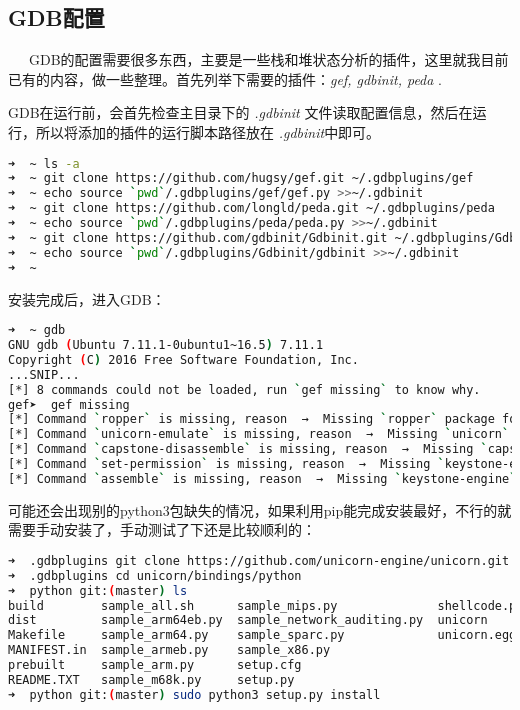 \documentclass[12pt]{article}  %
\begin{document}
\subsection{GDB配置}
\ \ \ GDB的配置需要很多东西，主要是一些栈和堆状态分析的插件，这里就我目前已有的内容，做一些整理。首先列举下需要的插件：\emph{gef, gdbinit, peda} .\par
GDB在运行前，会首先检查主目录下的 \emph{.gdbinit} 文件读取配置信息，然后在运行，所以将添加的插件的运行脚本路径放在 \emph{.gdbinit}中即可。
\begin{lstlisting}[language=sh]
➜  ~ ls -a
➜  ~ git clone https://github.com/hugsy/gef.git ~/.gdbplugins/gef
➜  ~ echo source `pwd`/.gdbplugins/gef/gef.py >>~/.gdbinit
➜  ~ git clone https://github.com/longld/peda.git ~/.gdbplugins/peda
➜  ~ echo source `pwd`/.gdbplugins/peda/peda.py >>~/.gdbinit
➜  ~ git clone https://github.com/gdbinit/Gdbinit.git ~/.gdbplugins/Gdbinit
➜  ~ echo source `pwd`/.gdbplugins/Gdbinit/gdbinit >>~/.gdbinit
➜  ~ 

\end{lstlisting}\par
安装完成后，进入GDB：
\begin{lstlisting}[language=sh]
➜  ~ gdb
GNU gdb (Ubuntu 7.11.1-0ubuntu1~16.5) 7.11.1
Copyright (C) 2016 Free Software Foundation, Inc.
...SNIP...
[*] 8 commands could not be loaded, run `gef missing` to know why.
gef➤  gef missing
[*] Command `ropper` is missing, reason  →  Missing `ropper` package for Python3, install with: `pip3 install ropper`.
[*] Command `unicorn-emulate` is missing, reason  →  Missing `unicorn` package for Python3. Install with `pip3 install unicorn`.
[*] Command `capstone-disassemble` is missing, reason  →  Missing `capstone` package for Python3. Install with `pip3 install capstone`.
[*] Command `set-permission` is missing, reason  →  Missing `keystone-engine` package for Python3, install with: `pip3 install keystone-engine`.
[*] Command `assemble` is missing, reason  →  Missing `keystone-engine` package for Python3, install with: `pip3 install keystone-engine`.


\end{lstlisting}\par
可能还会出现别的python3包缺失的情况，如果利用pip能完成安装最好，不行的就需要手动安装了，手动测试了下还是比较顺利的：\par
\begin{lstlisting}[language=sh]
➜  .gdbplugins git clone https://github.com/unicorn-engine/unicorn.git 
➜  .gdbplugins cd unicorn/bindings/python      
➜  python git:(master) ls
build        sample_all.sh      sample_mips.py              shellcode.py
dist         sample_arm64eb.py  sample_network_auditing.py  unicorn
Makefile     sample_arm64.py    sample_sparc.py             unicorn.egg-info
MANIFEST.in  sample_armeb.py    sample_x86.py
prebuilt     sample_arm.py      setup.cfg
README.TXT   sample_m68k.py     setup.py
➜  python git:(master) sudo python3 setup.py install
\end{lstlisting}\par
\end{document}

